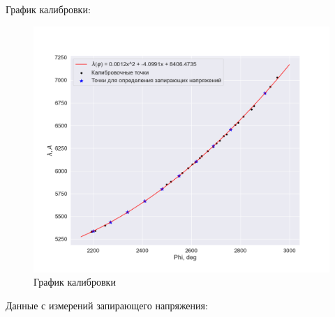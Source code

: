 \documentclass[a4paper, 12pt]{article}
\begin{document}
График калибровки:

\begin{figure}[H]
    \centering
    \includegraphics[width=1\textwidth]{plot1.png}
    \caption{График калибровки}
    \label{fig:calib}
\end{figure}

Данные с измерений запирающего напряжения:
\end{document}
